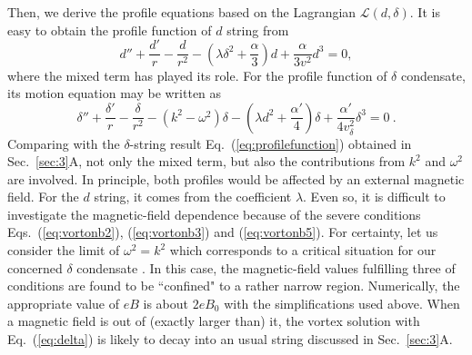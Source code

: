 \documentclass[12pt]{article}
\begin{document}
Then, we derive the profile equations based on the Lagrangian $\mathcal{L}(d,\delta)$.
It is easy to obtain the profile function of $d$ string from
\begin{equation}
  \label{eq:deuler}
  d'' +\frac{d'}{r} - \frac{d}{r^2} - (\lambda \delta^2 + \frac{\alpha}{3})d + \frac{\alpha}{3v^2}d^3 = 0,
\end{equation}
where the mixed term has played its role.
For the profile function of $\delta$ condensate, its motion equation may be written as
\begin{equation}
  \label{eq:beuler}
  \delta'' +\frac{\delta'}{r} - \frac{\delta}{r^2} - (k^2 - \omega^2)\delta - (\lambda d^2 + \frac{\alpha'}{4})\delta + \frac{\alpha'}{4v_\delta^2}\delta^3 = 0 \ .
\end{equation}
Comparing with the $\delta$-string result Eq.~(\ref{eq:profilefunction}) obtained in Sec.~\ref{sec:3}A,
not only the mixed term, but also the contributions from $k^2$ and $\omega^2$ are involved.
In principle, both profiles would be affected by an external magnetic field. For the $d$ string, it comes
from the coefficient $\lambda$. Even so, it is difficult to investigate the magnetic-field dependence
because of the severe conditions Eqs.~(\ref{eq:vortonb2}), (\ref{eq:vortonb3}) and (\ref{eq:vortonb5}).
For certainty, let us consider the limit of $\omega^2 = k^2$ which corresponds to a
critical situation for our concerned $\delta$ condensate \cite{lemperiere2003behaviour}.
In this case, the magnetic-field values fulfilling three of conditions are found to be ``confined" to a
rather narrow region.
Numerically, the appropriate value of $eB$ is about $2 eB_0$ with the simplifications used above.
When a magnetic field is out of (exactly larger than) it, the vortex solution with Eq.~(\ref{eq:delta})
is likely to decay into an usual string discussed in Sec.~\ref{sec:3}A.
\end{document}
